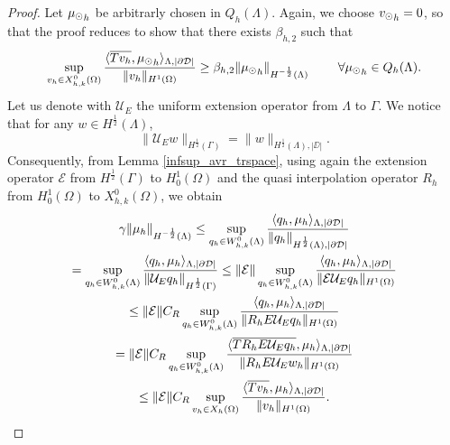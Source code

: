 \begin{proof}
Let ${\mu_{\odot}}_h$ be arbitrarly chosen in $Q_h(\Lambda)$. Again, we choose ${v_{\odot}}_h =0$, so that the proof reduces to show that there exists $\beta_{h,2}$ such that
\begin{equation*}
\sup_{v_h \in X_{h,k}^0(\Omega)} \frac{ \langle \overline{T v_h} , {\mu_{\odot}}_h \rangle _{\Lambda,|\partial\mathcal{D}|} } {\|v_h\|_{H^1(\Omega)} }\geq \beta_{h,2} \|{\mu_{\odot}}_h\|_{H^{-\frac 12}(\Lambda)}\ \qquad \forall {\mu_{\odot}}_h \in Q_h(\Lambda).
\end{equation*}
Let us denote with $\mathcal{U}_E$ the uniform extension operator from $\Lambda$ to $\Gamma$. {\color{red}We notice that for any $w \in H^{\frac 12}(\Lambda)$,
\begin{equation*}
\|\mathcal{U}_E w\|_{H^{\frac 12}(\Gamma)}= \|w\|_{H^{\frac 12}(\Lambda),|\DD|}.
\end{equation*}
}
Consequently, from Lemma \ref{infsup_avr_trspace}, using again the extension operator $\mathcal{E}$ from $H^{\frac 12}(\Gamma)$ to $H^1_0(\Omega)$ and the quasi interpolation operator $R_h$ from $H^1_0(\Omega)$ to $X^0_{h,k}(\Omega)$, we obtain
\begin{multline}
\gamma \|\mu_h\|_{H^{-\frac 12}(\Lambda)} \leq 
\sup_{q_h \in W_{h,k}^0(\Lambda)} \frac{ \langle q_h, \mu_h \rangle_{\Lambda,|\partial\mathcal{D}|} } {\|q_h\|_{H^{\frac 12}(\Lambda),|\partial\mathcal{D}|}} 
\\
=  \sup_{q_h \in W_{h,k}^0(\Lambda)} \frac{ \langle q_h, \mu_h \rangle _{\Lambda,|\partial\mathcal{D}|}} {\|\mathcal{U}_E q_h\|_{H^{\frac 12}(\Gamma)}} 
\leq \|\mathcal{E}\| \sup_{q_h \in W_{h,k}^0(\Lambda)} \frac{ \langle q_h, \mu_h \rangle _{\Lambda,|\partial\mathcal{D}|} } {\|\mathcal{E} \mathcal{U}_E q_h\|_{H^1(\Omega)}} 
\\
\leq \|\mathcal{E}\| C_R \sup_{q_h \in W_{h,k}^0(\Lambda)} \frac{ \langle q_h, \mu_h \rangle _{\Lambda,|\partial\mathcal{D}|} } {\|R_h E \mathcal{U}_E q_h\|_{H^1(\Omega)}}
\\ 
=  \|\mathcal{E}\| C_R \sup_{q_h \in W_{h,k}^0(\Lambda)} \frac{ \langle 	\overline{T  R_h E \mathcal{U}_E q_h}, \mu_h \rangle _{\Lambda,|\partial\mathcal{D}|}} {\|R_h E \mathcal{U}_E w_h\|_{H^1(\Omega)}}
\\
\leq \|\mathcal{E}\| C_R \sup_{v_h \in X_h(\Omega)} \frac{ \langle \overline{T v_h}, \mu_h \rangle _{\Lambda,|\partial\mathcal{D}|}} {\|v_h\|_{H^1(\Omega)}}. 
\end{multline}

\end{proof}